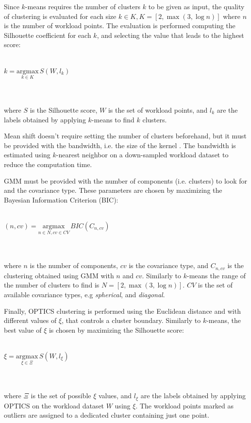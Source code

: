 \documentclass[a4paper, 12pt]{article} %
\begin{document}
	Since $k$-means requires the number of clusters $k$ to be given as input, the quality of clustering is evaluated for each size $k \in K, K = [2, \max (3, \log n)]$ where $n$ is the number of workload points. The evaluation is performed computing the Silhouette coefficient \cite{SilhouetteCoefficient} for each $k$, and selecting the value that leads to the highest score:\\\\
	\centerline{
		$
		k = \underset{k \in K}{\mathrm{argmax}}\, S(W, l_k)
		$
	}\\\\
	where $S$ is the Silhouette score, $W$ is the set of workload points, and $l_k$ are the labels obtained by applying $k$-means to find $k$ clusters.
	
	Mean shift doesn't require setting the number of clusters beforehand, but it must be provided with the bandwidth,  i.e. the size of the kernel \cite{MeanShift}. The bandwidth is estimated using $k$-nearest neighbor on a down-sampled workload dataset to reduce the computation time.
	
	GMM must be provided with the number of components (i.e. clusters) to look for and the covariance type. These parameters are chosen by maximizing the Bayesian Information Criterion (BIC):\\\\
	\centerline{
		$
		(n, cv) = \underset{n \in N, cv \in CV}{\mathrm{argmax}}\, BIC(C_{n, cv})
		$
	}\\\\
	where $n$ is the number of components, $cv$ is the covariance type, and $C_{n, cv}$ is the clustering obtained using GMM with $n$ and $cv$. Similarly to $k$-means the range of the number of clusters to find is $N = [2, \max (3, \log n)]$. $CV$ is the set of available covariance types, e.g \textit{spherical}, and \textit{diagonal}.
	
	Finally, OPTICS clustering is performed using the Euclidean distance and with different values of $\xi$, that controls a cluster boundary. Similarly to $k$-means, the best value of $\xi$ is chosen by maximizing the Silhouette score: \\\\
	\centerline{
		$
		\xi = \underset{\xi \in \Xi}{\mathrm{argmax}}\, S(W, l_\xi)
		$
	}\\\\
	where $\Xi$ is the set of possible $\xi$ values, and $l_\xi$ are the labels obtained by applying OPTICS on the workload dataset $W$ using $\xi$. The workload points marked as outliers are assigned to a dedicated cluster containing just one point.
	
\end{document}
